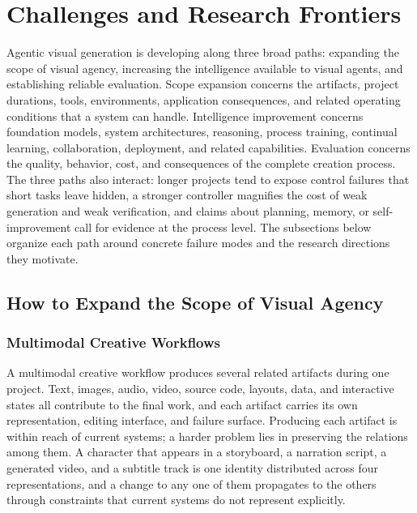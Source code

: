\iffalse
\section{Challenges and Research Frontiers}
\label{sec:frontiers}

Agentic visual generation is developing along three broad paths: expanding the scope of visual agency, increasing the intelligence available to visual agents, and establishing reliable evaluation. Scope expansion concerns the artifacts, project durations, tools, environments, application consequences, and related operating conditions that a system can handle. Intelligence improvement concerns foundation models, system architectures, reasoning, process training, continual learning, collaboration, deployment, and related capabilities. Evaluation concerns the quality, behavior, cost, and consequences of the complete creation process. The three paths also interact: longer projects tend to expose control failures that short tasks leave hidden, a stronger controller magnifies the cost of weak generation and weak verification, and claims about planning, memory, or self-improvement call for evidence at the process level. The subsections below organize each path around concrete failure modes and the research directions they motivate.

\subsection{How to Expand the Scope of Visual Agency}


\subsubsection{Multimodal Creative Workflows}

A multimodal creative workflow produces several related artifacts during one project. Text, images, audio, video, source code, layouts, data, and interactive states all contribute to the final work, and each artifact carries its own representation, editing interface, and failure surface. Producing each artifact is within reach of current systems; a harder problem lies in preserving the relations among them. A character that appears in a storyboard, a narration script, a generated video, and a subtitle track is one identity distributed across four representations, and a change to any one of them propagates to the others through constraints that current systems do not represent explicitly.

